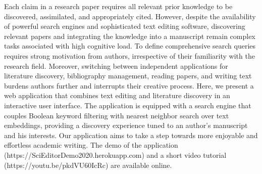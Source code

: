 Each claim in a research paper requires all relevant prior knowledge to be discovered, assimilated, and appropriately cited. However, despite the availability of powerful search engines and sophisticated text editing software, discovering relevant papers and integrating the knowledge into a manuscript remain complex tasks associated with high cognitive load. To define comprehensive search queries requires strong motivation from authors, irrespective of their familiarity with the research field. Moreover, switching between independent applications for literature discovery, bibliography management, reading papers, and writing text burdens authors further and interrupts their creative process. Here, we present a web application that combines text editing and literature discovery in an interactive user interface. The application is equipped with a search engine that couples Boolean keyword filtering with nearest neighbor search over text embeddings, providing a discovery experience tuned to an author's manuscript and his interests. Our application aims to take a step towards more enjoyable and effortless academic writing. The demo of the application (https://SciEditorDemo2020.herokuapp.com) and a short video tutorial (https://youtu.be/pkdVU60IcRc) are available online.
